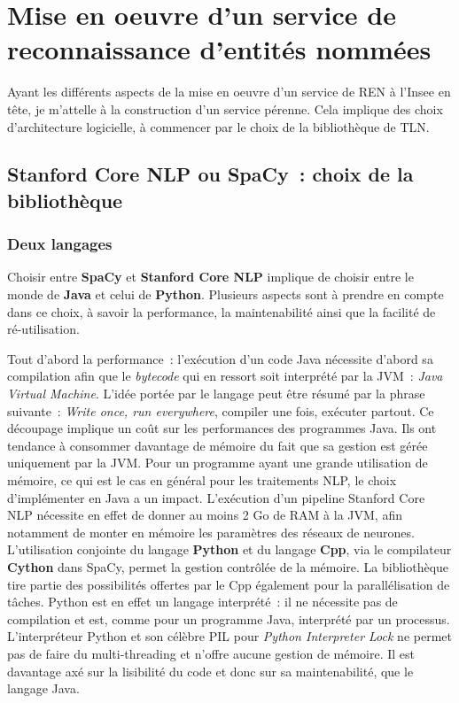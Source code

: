 \section{Mise en oeuvre d'un service de reconnaissance d'entités nommées}
Ayant les différents aspects de la mise en oeuvre d'un service de REN à l'Insee en tête, je m'attelle à la construction d'un service pérenne. Cela implique des choix d'architecture logicielle, à commencer par le choix de la bibliothèque de TLN.

\subsection{Stanford Core NLP ou SpaCy~: choix de la bibliothèque}

\subsubsection{Deux langages}
Choisir entre \textbf{SpaCy} et \textbf{Stanford Core NLP} implique de choisir entre le monde de \textbf{Java} et celui de \textbf{Python}. Plusieurs aspects sont à prendre en compte dans ce choix, à savoir la performance, la maintenabilité ainsi que la facilité de ré-utilisation. 
\newline

Tout d'abord la performance~: l'exécution d'un code Java nécessite d'abord sa compilation afin que le \textit{bytecode} qui en ressort soit interprété par la JVM~: \textit{Java Virtual Machine}. L'idée portée par le langage peut être résumé par la phrase suivante~: \textit{Write once, run everywhere}, compiler une fois, exécuter partout. Ce découpage implique un coût sur les performances des programmes Java. Ils ont tendance à consommer davantage de mémoire du fait que sa gestion est gérée uniquement par la JVM. Pour un programme ayant une grande utilisation de mémoire, ce qui est le cas en général pour les traitements NLP, le choix d'implémenter en Java a un impact. L'exécution d'un pipeline Stanford Core NLP nécessite en effet de donner au moins 2 Go de RAM à la JVM, afin notamment de monter en mémoire les paramètres des réseaux de neurones. L'utilisation conjointe du langage \textbf{Python} et du langage \textbf{Cpp}, via le compilateur \textbf{Cython} dans SpaCy, permet la gestion contrôlée de la mémoire. La bibliothèque tire partie des possibilités offertes par le Cpp également pour la parallélisation de tâches. Python est en effet un langage interprété~: il ne nécessite pas de compilation et est, comme pour un programme Java, interprété par un processus. L'interpréteur Python et son célèbre PIL pour \textit{Python Interpreter Lock} ne permet pas de faire du multi-threading et n'offre aucune gestion de mémoire. Il est davantage axé sur la lisibilité du code et donc sur sa maintenabilité, que le langage Java.
\newline

